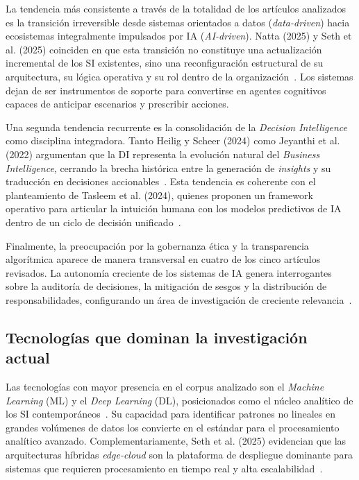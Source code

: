 \documentclass[conference]{IEEEtran}
\begin{document}
La tendencia más consistente a través de la totalidad de los artículos analizados es la transición irreversible desde sistemas orientados a datos (\textit{data-driven}) hacia ecosistemas integralmente impulsados por IA (\textit{AI-driven}). Natta (2025) y Seth et al. (2025) coinciden en que esta transición no constituye una actualización incremental de los SI existentes, sino una reconfiguración estructural de su arquitectura, su lógica operativa y su rol dentro de la organización~\cite{natta2025, seth2025}. Los sistemas dejan de ser instrumentos de soporte para convertirse en agentes cognitivos capaces de anticipar escenarios y prescribir acciones.
 
Una segunda tendencia recurrente es la consolidación de la \textit{Decision Intelligence} como disciplina integradora. Tanto Heilig y Scheer (2024) como Jeyanthi et al. (2022) argumentan que la DI representa la evolución natural del \textit{Business Intelligence}, cerrando la brecha histórica entre la generación de \textit{insights} y su traducción en decisiones accionables~\cite{heilig2024, jeyanthi2022}. Esta tendencia es coherente con el planteamiento de Tasleem et al. (2024), quienes proponen un framework operativo para articular la intuición humana con los modelos predictivos de IA dentro de un ciclo de decisión unificado~\cite{tasleem2024}.
 
Finalmente, la preocupación por la gobernanza ética y la transparencia algorítmica aparece de manera transversal en cuatro de los cinco artículos revisados. La autonomía creciente de los sistemas de IA genera interrogantes sobre la auditoría de decisiones, la mitigación de sesgos y la distribución de responsabilidades, configurando un área de investigación de creciente relevancia~\cite{natta2025, tasleem2024}.
 
\subsection{Tecnologías que dominan la investigación actual}
 
Las tecnologías con mayor presencia en el corpus analizado son el \textit{Machine Learning} (ML) y el \textit{Deep Learning} (DL), posicionados como el núcleo analítico de los SI contemporáneos~\cite{natta2025, heilig2024}. Su capacidad para identificar patrones no lineales en grandes volúmenes de datos los convierte en el estándar para el procesamiento analítico avanzado. Complementariamente, Seth et al. (2025) evidencian que las arquitecturas híbridas \textit{edge-cloud} son la plataforma de despliegue dominante para sistemas que requieren procesamiento en tiempo real y alta escalabilidad~\cite{seth2025}.
 
\end{document}
